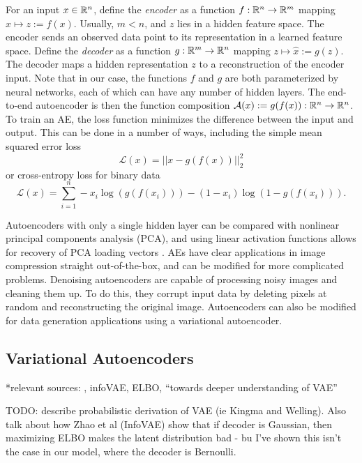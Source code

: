For an input $x \in \mathbb{R}^n$, define the \textit{encoder} as a function $f: \mathbb{R}^n \to \mathbb{R}^m$ mapping $x \mapsto z := f(x)$. Usually, $m < n$, and $z$ lies in a hidden feature space. The encoder sends an observed data point to its representation in a learned feature space. Define the \textit{decoder} as a function $g: \mathbb{R}^m \to \mathbb{R}^n$ mapping $z \mapsto \hat x := g(z)$. The decoder maps a hidden representation $z$ to a reconstruction of the encoder input. Note that in our case, the functions $f$ and $g$ are both parameterized by neural networks, each of which can have any number of hidden layers. The end-to-end autoencoder is then the function composition $\mathcal{A}(x):= g(f(x)): \mathbb{R}^n \to \mathbb{R}^n$. To train an AE, the loss function minimizes the difference between the input and output. This can be done in a number of ways, including the simple mean squared error loss
\begin{equation}
  \mathcal{L}(x) = || x - g(f(x))||_2^2
  \label{eq:mse}
\end{equation}
or cross-entropy loss for binary data
\begin{equation}
  \mathcal{L}(x) = \sum_{i=1}^n - x_i \log(g(f(x_i))) - (1-x_i)\log(1- g(f(x_i))).
  \label{eq:cross_entropy}
\end{equation}

Autoencoders with only a single hidden layer can be compared with nonlinear principal components analysis (PCA), and using linear activation functions allows for recovery of PCA loading vectors \cite{plaut2018}. AEs have clear applications in image compression straight out-of-the-box, and can be modified for more complicated problems. Denoising autoencoders \cite{vincent2008} are capable of processing noisy images and cleaning them up. To do this, they corrupt input data by deleting pixels at random and reconstructing the original image. Autoencoders can also be modified for data generation applications using a variational autoencoder.

\subsection{Variational Autoencoders}
*relevant sources: \cite{doersch2016} \cite{kingma2014} \cite{Blei2017}, infoVAE, ELBO, ``towards deeper understanding of VAE''

TODO: describe probabilistic derivation of VAE (ie Kingma and Welling). Also talk about how Zhao et al (InfoVAE) show that if decoder is Gaussian, then maximizing ELBO makes the latent distribution bad - bu I've shown this isn't the case in our model, where the decoder is Bernoulli.

